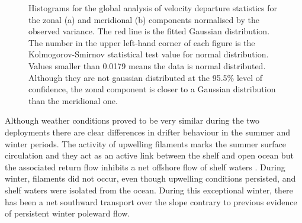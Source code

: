 \begin{figure}
\centering %
\caption{Histograms for the global analysis of velocity departure
statistics for the zonal (a) and meridional (b) components
normalised by the observed variance. The red line is the fitted
Gaussian distribution. The number in the upper left-hand corner of
each figure is the Kolmogorov-Smirnov statistical test value for
normal distribution. Values smaller than 0.0179 means the data is
normal distributed. Although they are not gaussian distributed at
the 95.5\% level of confidence, the zonal component is closer to a
Gaussian distribution than the meridional one.}
\label{fig:drf_hist}%
\end{figure}
Although weather conditions proved to be very similar during the
two deployments there are clear differences in drifter behaviour
in the summer and winter periods. The activity of upwelling
filaments marks the summer surface circulation and they act as an
active link between the shelf and open ocean but the associated
return flow inhibits a net offshore flow of shelf waters
\citep{Barton01}. During winter, filaments did not occur, even
though upwelling conditions persisted, and shelf waters were
isolated from the ocean. During this exceptional winter, there has
been a net southward transport over the slope contrary to previous
evidence of persistent winter poleward flow.

